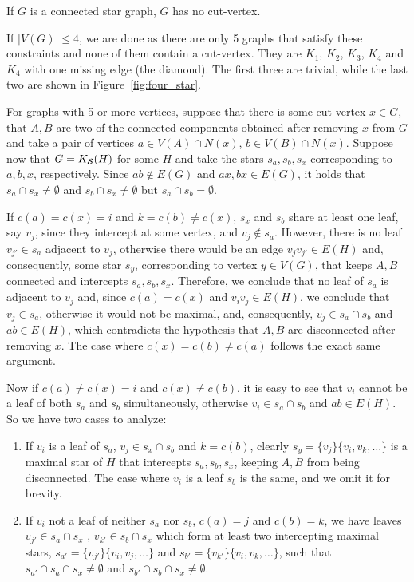 \begin{theorem}
    \label{thm:star_cutless}
    If $G$ is a connected star graph, $G$ has no cut-vertex.
\end{theorem}

\begin{tproof}
    If $|V(G)| \leq 4$, we are done as there are only 5 graphs that satisfy these constraints and none of them contain a cut-vertex.
    They are $K_1$, $K_2$, $K_3$, $K_4$ and $K_4$ with one missing edge (the diamond).
    The first three are trivial, while the last two are shown in Figure~\ref{fig:four_star}.
    
    For graphs with 5 or more vertices, suppose that there is some cut-vertex $x \in G$, that $A,B$ are two of the connected components obtained after removing $x$ from $G$ and take a pair of vertices $a \in V(A) \cap N(x)$, $b \in V(B) \cap N(x)$.
    Suppose now that $G = K_{\mathcal{S}}(H)$ for some $H$ and take the stars $s_a, s_b, s_x$ corresponding to $a, b, x$, respectively.
    Since $ab \notin E(G)$ and $ax, bx \in E(G)$, it holds that $s_a \cap s_x \neq \emptyset$ and $s_b \cap s_x \neq \emptyset$ but $s_a \cap s_b = \emptyset$.
    
    If $c(a) = c(x) = i$ and $k = c(b) \neq c(x)$, $s_x$ and $s_b$ share at least one leaf, say $v_j$, since they intercept at some vertex, and $v_j \notin s_a$.
    However, there is no leaf $v_{j'} \in s_a$ adjacent to $v_j$, otherwise there would be an edge $v_jv_{j'} \in E(H)$ and, consequently, some star $s_y$, corresponding to vertex $y \in V(G)$, that keeps $A,B$ connected and intercepts $s_a, s_b, s_x$.
    Therefore, we conclude that no leaf of $s_a$ is adjacent to $v_j$ and, since $c(a) = c(x)$ and $v_iv_j \in E(H)$, we conclude that $v_j \in s_a$, otherwise it would not be maximal, and, consequently, $v_j \in s_a \cap s_b$ and $ab \in E(H)$, which contradicts the hypothesis that $A,B$ are disconnected after removing $x$.
    The case where $c(x) = c(b) \neq c(a)$ follows the exact same argument.
    
    Now if $c(a) \neq c(x) = i$ and $c(x) \neq c(b)$, it is easy to see that $v_i$ cannot be a leaf of both $s_a$ and $s_b$ simultaneously, otherwise $v_i \in s_a \cap s_b$ and $ab \in E(H)$.
    So we have two cases to analyze:
    \begin{enumerate}
        \item If $v_i$ is a leaf of $s_a$, $v_j \in s_x \cap s_b$ and $k = c(b)$, clearly $s_y = \{v_j\}\{v_i, v_k, \dots \}$ is a maximal star of $H$ that intercepts $s_a, s_b, s_x$, keeping $A,B$ from being disconnected.
        The case where $v_i$ is a leaf $s_b$ is the same, and we omit it for brevity.
        \item If $v_i$ not a leaf of neither $s_a$ nor $s_b$, $c(a) = j$ and $c(b) = k$, we have leaves $v_{j'} \in s_a \cap s_x$ , $v_{k'} \in s_b \cap s_x$ which form at least two intercepting maximal stars, $s_{a'} = \{v_{j'}\}\{v_i, v_j, \dots\}$ and $s_{b'} = \{v_{k'}\}\{v_i, v_k, \dots\}$, such that $s_{a'} \cap s_a \cap s_x \neq \emptyset$ and $s_{b'} \cap s_b \cap s_x \neq \emptyset$.
    \end{enumerate}
    

\end{tproof}
